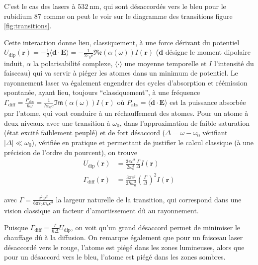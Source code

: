 \documentclass[11pt,a4paper] { article}
\newcommand{\lmbd}[1]{$\SI{#1}{\nano\metre}$}
\newcommand{\e}[1]{\text{e}^{#1}}
\newcommand{\mathsc}[1]{\mathrm{\scriptscriptstyle {#1}}}
\renewcommand{\v}[1]{\boldsymbol{\mathbf{#1}}}
\begin{document}
C'est le cas des lasers à \lmbd{532}, qui sont désaccordés vers le bleu pour le rubidium 87 comme on peut le voir sur le diagramme des transitions figure \ref{fig:transitions}.

Cette interaction donne lieu, classiquement, à une force dérivant du potentiel $U_\mathsc{dip}(\v r) = {-\frac12 \langle \v d \cdot \v E \rangle} = -\frac{1}{2\varepsilon_0 c}\mathfrak{Re}\left(\alpha(\omega)\right) I(\v r)$ ($\v d$ désigne le moment dipolaire induit, $\alpha$ la polarisabilité complexe, $\langle \cdot \rangle$ une moyenne temporelle et $I$ l'intensité du faisceau)
qui va servir à piéger les atomes dans un minimum de potentiel. Le rayonnement laser va également engendrer des cycles d'absorption et réémission spontanée, ayant lieu, toujours ``classiquement'', à une fréquence $\Gamma_\mathsc{diff} = \frac{P_\mathsc{abs}}{\hbar \omega} = \frac{1}{\hbar \varepsilon_0 c} \mathfrak{Im}\left(\alpha(\omega)\right) I(\v r)$ où $P_\mathsc{abs} = \langle \dot{\v d} \cdot \v E \rangle$ est la puissance absorbée par l'atome, qui vont conduire à un réchauffement des atomes. 
Pour un atome à deux niveaux avec une transition à $\omega_0$, dans l'approximation de faible saturation (état excité faiblement peuplé) et de fort désaccord ($\Delta = \omega - \omega_0$ vérifiant $|\Delta| \ll \omega_0$), vérifiée en pratique et permettant de justifier le calcul classique (à une précision de l'ordre du pourcent), on trouve
\vspace{-0.2cm}
\begin{align}
	U_\mathsc{dip}(\v r)&=\frac{3\pi c^2}{2\omega_0^3} \frac{\Gamma}{\Delta} I(\v r) \\
	\Gamma_\mathsc{diff}(\v r)&=\frac{3\pi c^2}{2\hbar\omega_0^3} \left(\frac{\Gamma}{\Delta}\right)^2 I(\v r) 
\end{align}

avec $\Gamma = \frac{\e 2 \omega^2}{6 \pi \varepsilon_0 m_e c^3}$ la largeur naturelle de la transition, qui correspond dans une vision classique au facteur d'amortissement dû au rayonnement.

Puisque $\Gamma_\mathsc{diff}=\frac{\Gamma}{\hbar \Delta} U_\mathsc{dip}$, on voit qu'un grand désaccord permet de minimiser le chauffage dû à la diffusion. On remarque également que pour un faisceau laser désaccordé vers le rouge, l'atome est piégé dans les zones lumineuses, alors que pour un désaccord vers le bleu, l'atome est piégé dans les zones sombres.
\end{document}
